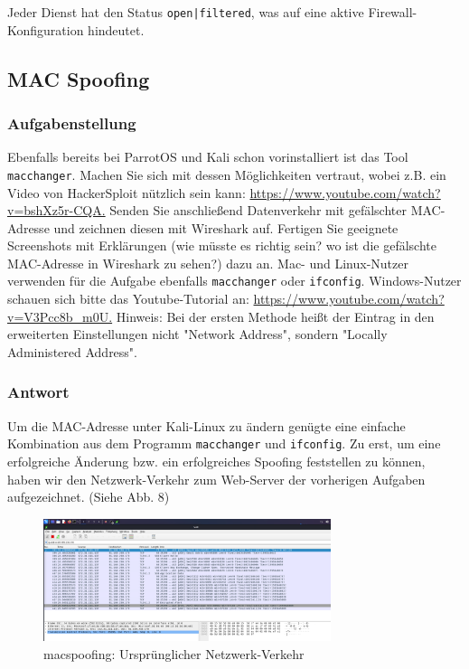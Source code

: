 \documentclass{article}
\begin{document}
Jeder Dienst hat den Status \texttt{open|filtered}, was auf eine aktive Firewall-Konfiguration hindeutet.

\newpage

\subsection{MAC Spoofing}

\subsubsection*{Aufgabenstellung}

Ebenfalls bereits bei ParrotOS und Kali schon vorinstalliert ist das Tool 
\texttt{macchanger}. Machen Sie sich mit dessen Möglichkeiten vertraut, wobei z.B. ein 
Video von HackerSploit nützlich sein kann: \url{https://www.youtube.com/watch?v=bshXz5r-CQA.}
Senden Sie anschließend Datenverkehr mit gefälschter MAC-Adresse und zeichnen diesen mit 
Wireshark auf. Fertigen Sie geeignete Screenshots mit Erklärungen (wie müsste es richtig 
sein? wo ist die gefälschte MAC-Adresse in Wireshark zu sehen?) dazu an.
Mac- und Linux-Nutzer verwenden für die Aufgabe ebenfalls \texttt{macchanger} oder 
\texttt{ifconfig}. Windows-Nutzer schauen sich bitte das Youtube-Tutorial an:
\url{https://www.youtube.com/watch?v=V3Pcc8b_m0U.}
Hinweis: Bei der ersten Methode heißt der Eintrag in den erweiterten Einstellungen nicht
"Network Address", sondern "Locally Administered Address".

\subsubsection*{Antwort}

Um die MAC-Adresse unter Kali-Linux zu ändern genügte eine einfache Kombination aus dem 
Programm \texttt{macchanger} und \texttt{ifconfig}. Zu erst, um eine erfolgreiche Änderung 
bzw. ein erfolgreiches Spoofing feststellen zu können, haben wir den Netzwerk-Verkehr zum 
Web-Server der vorherigen Aufgaben aufgezeichnet. (Siehe Abb. 8)

\begin{figure}[H]
	\includegraphics[width=0.75\textwidth]{images/08}
	\centering
	\caption{macspoofing: Ursprünglicher Netzwerk-Verkehr}
\end{figure}
\end{document}

